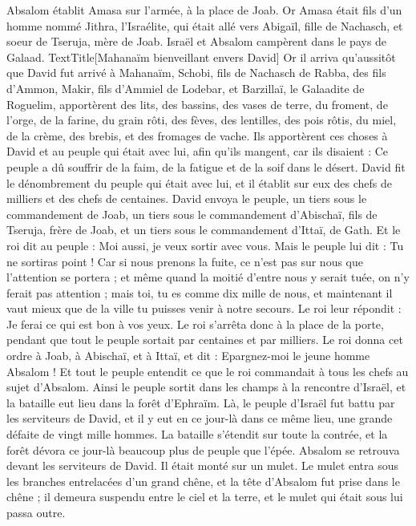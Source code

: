 \begin{multicols}{2}
Absalom établit Amasa sur l'armée, à la place de Joab. Or Amasa était fils d'un homme nommé Jithra, l'Israélite, qui était allé vers Abigaïl, fille de Nachasch, et soeur de Tseruja, mère de Joab.
Israël et Absalom campèrent dans le pays de Galaad.
TextTitle{[Mahanaïm bienveillant envers David]}
Or il arriva qu’aussitôt que David fut arrivé à Mahanaïm, Schobi, fils de Nachasch de Rabba, des fils d'Ammon, Makir, fils d'Ammiel de Lodebar, et Barzillaï, le Galaadite de Roguelim,
apportèrent des lits, des bassins, des vases de terre, du froment, de l'orge, de la farine, du grain rôti, des fèves, des lentilles, des pois rôtis,
du miel, de la crème, des brebis, et des fromages de vache. Ils apportèrent ces choses à David et au peuple qui était avec lui, afin qu'ils mangent, car ils disaient : Ce peuple a dû souffrir de la faim, de la fatigue et de la soif dans le désert.
\VerseOne{}David fit le dénombrement du peuple qui était avec lui, et il établit sur eux des chefs de milliers et des chefs de centaines.
David envoya le peuple, un tiers sous le commandement de Joab, un tiers sous le commandement d'Abischaï, fils de Tseruja, frère de Joab, et un tiers sous le commandement d'Ittaï, de Gath. Et le roi dit au peuple : Moi aussi, je veux sortir avec vous.
Mais le peuple lui dit : Tu ne sortiras point ! Car si nous prenons la fuite, ce n'est pas sur nous que l'attention se portera ; et même quand la moitié d'entre nous y serait tuée, on n'y ferait pas attention ; mais toi, tu es comme dix mille de nous, et maintenant il vaut mieux que de la ville tu puisses venir à notre secours.
Le roi leur répondit : Je ferai ce qui est bon à vos yeux. Le roi s'arrêta donc à la place de la porte, pendant que tout le peuple sortait par centaines et par milliers.
Le roi donna cet ordre à Joab, à Abischaï, et à Ittaï, et dit : Epargnez-moi le jeune homme Absalom ! Et tout le peuple entendit ce que le roi commandait à tous les chefs au sujet d’Absalom.
Ainsi le peuple sortit dans les champs à la rencontre d'Israël, et la bataille eut lieu dans la forêt d'Ephraïm.
Là, le peuple d'Israël fut battu par les serviteurs de David, et il y eut en ce jour-là dans ce même lieu, une grande défaite de vingt mille hommes.
La bataille s'étendit sur toute la contrée, et la forêt dévora ce jour-là beaucoup plus de peuple que l'épée.
\TextTitle{Joab exécute Absalom]}
Absalom se retrouva devant les serviteurs de David. Il était monté sur un mulet. Le mulet entra sous les branches entrelacées d'un grand chêne, et la tête d'Absalom fut prise dans le chêne ; il demeura suspendu entre le ciel et la terre, et le mulet qui était sous lui passa outre.

\end{multicols}
